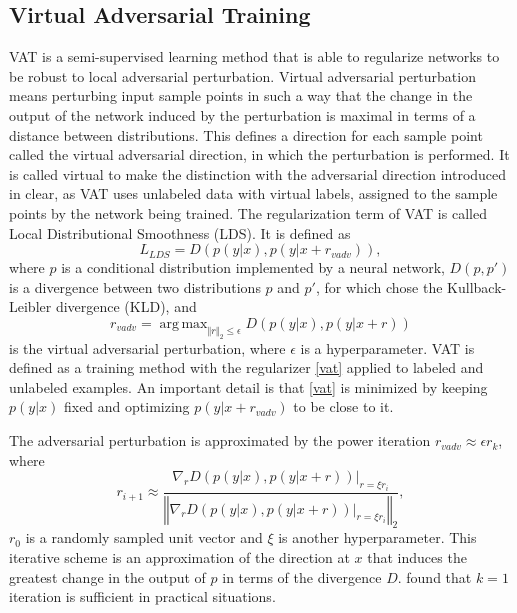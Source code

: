 \documentclass{article}
\DeclareMathOperator*{\argmax}{arg\,max}
\begin{document}
\subsection{Virtual Adversarial Training}
VAT \citep{Miyatoetal2017} is a semi-supervised learning method that is able to regularize networks to be robust to local adversarial perturbation. Virtual adversarial perturbation means perturbing input sample points in such a way that the change in the output of the network induced by the perturbation is maximal in terms of a distance between distributions. This defines a direction for each sample point called the virtual adversarial direction, in which the perturbation is performed. It is called virtual to make the distinction with the adversarial direction introduced in \citet{Goodfellowetal2014b} clear, as VAT uses unlabeled data with virtual labels, assigned to the sample points by the network being trained. The regularization term of VAT is called Local Distributional Smoothness (LDS). It is defined as
\begin{equation} \label{vat}
L_{LDS}=D\left(p(y\vert x),p(y\vert x+r_{vadv})\right),
\end{equation}
where $p$ is a conditional distribution implemented by a neural network, $D(p,p')$ is a divergence between two distributions $p$ and $p'$, for which \citet{Miyatoetal2017} chose the Kullback-Leibler divergence (KLD), and
\begin{equation} \label{vat_radv}
r_{vadv}=\argmax_{\Vert r\Vert_2\leq\epsilon}D\left(p(y\vert x),p(y\vert x+r)\right)
\end{equation}
is the virtual adversarial perturbation, where $\epsilon$ is a hyperparameter. VAT is defined as a training method with the regularizer \eqref{vat} applied to labeled and unlabeled examples. An important detail is that \eqref{vat} is minimized by keeping $p(y\vert x)$ fixed and optimizing $p(y\vert x+r_{vadv})$ to be close to it.

The adversarial perturbation is approximated by the power iteration $r_{vadv}\approx\epsilon r_k$, where
\begin{equation}
r_{i+1} \approx \frac{
\nabla_rD\left(p(y\vert x),p(y\vert x+r)\right)\Big\vert_{r=\xi r_i}
}{
\left\Vert \nabla_rD\left(p(y\vert x),p(y\vert x+r)\right)\Big\vert_{r=\xi r_i} \right\Vert_2
},
\end{equation}
$r_0$ is a randomly sampled unit vector and $\xi$ is another hyperparameter. This iterative scheme is an approximation of the direction at $x$ that induces the greatest change in the output of $p$ in terms of the divergence $D$. \cite{Miyatoetal2017} found that $k=1$ iteration is sufficient in practical situations.
\end{document}
